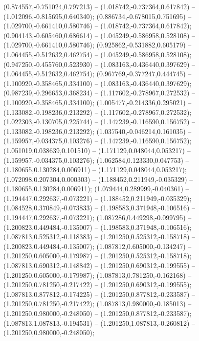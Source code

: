  (0.874557,-0.751024,0.797213) -- (1.018742,-0.737364,0.617842) -- (1.012096,-0.815695,0.640340);
 (0.886734,-0.678015,0.751695) -- (1.029700,-0.661410,0.580746) -- (1.018742,-0.737364,0.617842);
 (0.904143,-0.605460,0.686614) -- (1.045249,-0.586958,0.528108) -- (1.029700,-0.661410,0.580746);
 (0.925862,-0.531882,0.605179) -- (1.064455,-0.512632,0.462754) -- (1.045249,-0.586958,0.528108);
 (0.947250,-0.455760,0.523930) -- (1.083163,-0.436440,0.397629) -- (1.064455,-0.512632,0.462754);
 (0.967769,-0.377247,0.444745) -- (1.100920,-0.358465,0.334100) -- (1.083163,-0.436440,0.397629);
 (0.987239,-0.296653,0.368234) -- (1.117602,-0.278967,0.272532) -- (1.100920,-0.358465,0.334100);
 (1.005477,-0.214336,0.295021) -- (1.133082,-0.198236,0.213292) -- (1.117602,-0.278967,0.272532);
 (1.022303,-0.130705,0.225744) -- (1.147239,-0.116590,0.156752) -- (1.133082,-0.198236,0.213292);
 (1.037540,-0.046214,0.161035) -- (1.159957,-0.034375,0.103276) -- (1.147239,-0.116590,0.156752);
 (1.051019,0.038639,0.101510) -- (1.171129,0.048044,0.053217) -- (1.159957,-0.034375,0.103276);
 (1.062584,0.123330,0.047753) -- (1.180655,0.130284,0.006911) -- (1.171129,0.048044,0.053217);
 (1.072098,0.207304,0.000303) -- (1.188452,0.211949,-0.035329) -- (1.180655,0.130284,0.006911);
 (1.079444,0.289999,-0.040361) -- (1.194447,0.292637,-0.073221) -- (1.188452,0.211949,-0.035329);
 (1.084528,0.370849,-0.073833) -- (1.198583,0.371948,-0.106516) -- (1.194447,0.292637,-0.073221);
 (1.087286,0.449298,-0.099795) -- (1.200823,0.449484,-0.135007) -- (1.198583,0.371948,-0.106516);
 (1.087813,0.525312,-0.118383) -- (1.201250,0.525312,-0.158718) -- (1.200823,0.449484,-0.135007);
 (1.087812,0.605000,-0.134247) -- (1.201250,0.605000,-0.179987) -- (1.201250,0.525312,-0.158718);
 (1.087813,0.690312,-0.148842) -- (1.201250,0.690312,-0.199555) -- (1.201250,0.605000,-0.179987);
 (1.087813,0.781250,-0.162168) -- (1.201250,0.781250,-0.217422) -- (1.201250,0.690312,-0.199555);
 (1.087813,0.877812,-0.174225) -- (1.201250,0.877812,-0.233587) -- (1.201250,0.781250,-0.217422);
 (1.087813,0.980000,-0.185013) -- (1.201250,0.980000,-0.248050) -- (1.201250,0.877812,-0.233587);
 (1.087813,1.087813,-0.194531) -- (1.201250,1.087813,-0.260812) -- (1.201250,0.980000,-0.248050);
